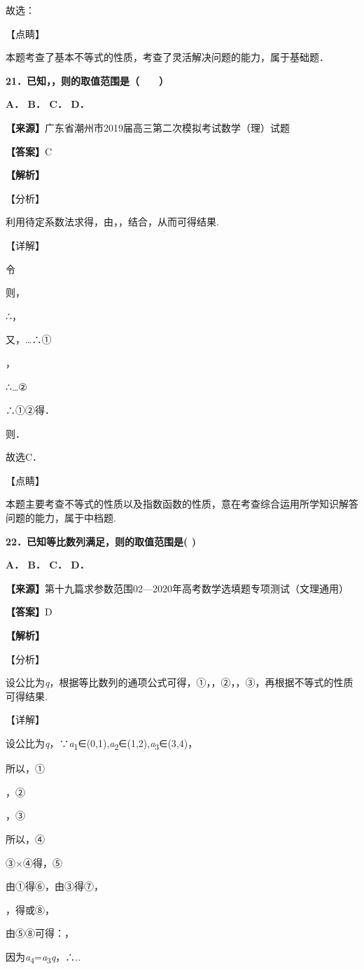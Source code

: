 \documentclass[
]{article}
\begin{document}
故选：

【点睛】

本题考查了基本不等式的性质，考查了灵活解决问题的能力，属于基础题．

\textbf{21．已知，，则的取值范围是（　　）}

\textbf{A． B． C． D．}

\textbf{【来源】}广东省潮州市2019届高三第二次模拟考试数学（理）试题

\textbf{【答案】}C

\textbf{【解析】}

【分析】

利用待定系数法求得，由，，结合，从而可得结果.

【详解】

令

则，

∴，

又，\ldots∴①

，

∴\ldots②

∴①②得．

则．

故选C．

【点睛】

本题主要考查不等式的性质以及指数函数的性质，意在考查综合运用所学知识解答问题的能力，属于中档题.

\textbf{22．已知等比数列满足，则的取值范围是( )}

\textbf{A． B． C． D．}

\textbf{【来源】}第十九篇求参数范围02---2020年高考数学选填题专项测试（文理通用）

\textbf{【答案】}D

\textbf{【解析】}

【分析】

设公比为\emph{q}，根据等比数列的通项公式可得，①，，②，，③，再根据不等式的性质可得结果.

【详解】

设公比为\emph{q}，∵\emph{a}\textsubscript{1}∈(0,1),\emph{a}\textsubscript{2}∈(1,2),\emph{a}\textsubscript{3}∈(3,4)，

所以，①

，②

，③

所以，④

③×④得，⑤

由①得⑥，由③得⑦，

，得或⑧，

由⑤⑧可得：，

因为\emph{a}\textsubscript{4}=\emph{a}\textsubscript{3}\emph{q}，∴..
\end{document}
